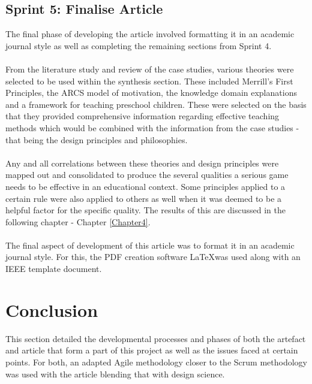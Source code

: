 \subsection{Sprint 5: Finalise Article}
The final phase of developing the article involved formatting it in an academic journal style as well as completing the remaining sections from Sprint 4. 
\\\\
From the literature study and review of the case studies, various theories were selected to be used within the synthesis section. These included Merrill's First Principles, the ARCS model of motivation, the knowledge domain explanations and a framework for teaching preschool children. These were selected on the basis that they provided comprehensive information regarding effective teaching methods which would be combined with the information from the case studies - that being the design principles and philosophies. 
\\\\
Any and all correlations between these theories and design principles were mapped out and consolidated to produce the several qualities a serious game needs to be effective in an educational context. Some principles applied to a certain rule were also applied to others as well when it was deemed to be a helpful factor for the specific quality. The results of this are discussed in the following chapter - Chapter \ref{Chapter4}.
\\\\ 
The final aspect of development of this article was to format it in an academic journal style. For this, the PDF creation software \LaTeX was used along with an IEEE template document.

\section{Conclusion}
This section detailed the developmental processes and phases of both the artefact and article that form a part of this project as well as the issues faced at certain points. For both, an adapted Agile methodology closer to the Scrum methodology was used with the article blending that with design science.